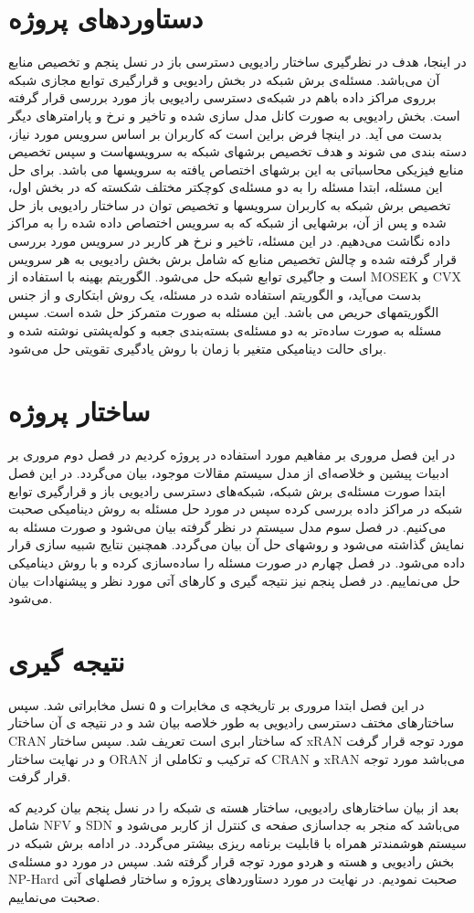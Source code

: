 \section{دستاوردهای پروژه}
در اینجا، هدف در نظرگیری ساختار رادیویی دسترسی باز در نسل پنجم و تخصیص منابع آن می‌باشد.
مسئله‌ی برش شبکه در بخش رادیویی و قرارگیری توابع مجازی شبکه برروی مراکز داده باهم در شبکه‌ی دسترسی رادیویی باز مورد بررسی قرار گرفته است. بخش رادیویی به صورت کانل مدل سازی شده و تاخیر و نرخ و پارامترهای دیگر بدست می آید. در اینچا فرض براین است که کاربران بر اساس سرویس مورد نیاز، دسته بندی می شوند و هدف تخصیص برشهای شبکه به سرویسهاست و سپس تخصیص منابع فیزیکی محاسباتی به این برشهای اختصاص یافته به سرویسها می باشد.
برای حل این مسئله، ابتدا مسئله را به دو مسئله‌ی کوچکتر مختلف شکسته که در بخش اول، تخصیص برش شبکه به کاربران سرویسها و تخصیص توان در ساختار رادیویی باز حل شده و پس از آن، برشهایی از شبکه که به سرویس اختصاص داده شده را به مراکز داده نگاشت می‌دهیم.
در این مسئله، تاخیر و نرخ هر کاربر در سرویس مورد بررسی قرار گرفته شده و چالش تخصیص منابع که شامل برش بخش رادیویی به هر سرویس است و جاگیری توابع شبکه حل می‌شود.
الگوریتم بهینه  با استفاده از MOSEK و CVX بدست می‌آید، و الگوریتم استفاده شده در مسئله، یک روش ابتکاری و از جنس الگوریتمهای حریص می باشد. این مسئله به صورت متمرکز حل شده است. 
سپس مسئله به صورت ساده‌تر به دو مسئله‌ی بسته‌بندی جعبه و کوله‌پشتی نوشته شده و برای حالت دینامیکی متغیر با زمان با روش یادگیری تقویتی حل می‌شود.
\section{ساختار پروژه}
در این فصل مروری بر مفاهیم مورد استفاده در پروژه کردیم
در فصل دوم مروری بر ادبیات پیشین و خلاصه‌ای از مدل سیستم مقالات موجود، بیان می‌گردد. در این فصل ابتدا صورت مسئله‌ی برش شبکه، شبکه‌های دسترسی رادیویی باز و قرارگیری توابع شبکه در مراکز داده بررسی کرده سپس در مورد حل مسئله به روش دینامیکی صحبت می‌کنیم.
در فصل سوم مدل سیستم در نظر گرفته بیان می‌شود و صورت مسئله به نمایش گذاشته می‌شود و روشهای حل آن بیان می‌گردد. همچنین  نتایج شبیه سازی قرار داده می‌شود.
در فصل چهارم در صورت مسئله را ساده‌سازی کرده و با روش دینامیکی حل می‌نماییم.
در فصل پنجم نیز نتیجه گیری و کارهای آتی مورد نظر و پیشنهادات بیان می‌شود.   
\section{نتیجه گیری}
در این فصل ابتدا مروری بر تاریخچه ی مخابرات و ۵ نسل مخابراتی شد. سپس ساختارهای مختف دسترسی رادیویی به طور خلاصه بیان شد و در نتیجه ی آن ساختار CRAN که ساختار ابری است تعریف شد. سپس ساختار xRAN
مورد توجه قرار گرفت و در نهایت ساختار ORAN 
که ترکیب و تکاملی از CRAN و xRAN می‌باشد مورد توجه قرار گرفت.

بعد از بیان ساختارهای رادیویی، ساختار هسته ی شبکه را در نسل پنجم بیان کردیم که شامل 
NFV و SDN 
می‌باشد که منجر به جداسازی صفحه ی کنترل از کاربر می‌شود و سیستم هوشمندتر همراه با قابلیت برنامه ریزی بیشتر می‌گردد.
در ادامه برش شبکه در بخش رادیویی و هسته و هردو مورد توجه قرار گرفته شد.
سپس در مورد دو مسئله‌ی NP-Hard صحبت نمودیم. در نهایت در مورد دستاوردهای پروژه و ساختار فصلهای آتی صحبت می‌نماییم. 